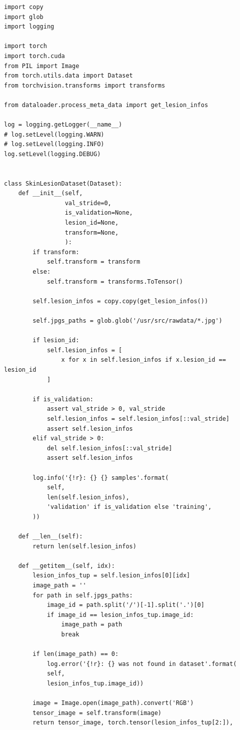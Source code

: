 \begin{lstlisting}
import copy
import glob
import logging

import torch
import torch.cuda
from PIL import Image
from torch.utils.data import Dataset
from torchvision.transforms import transforms

from dataloader.process_meta_data import get_lesion_infos

log = logging.getLogger(__name__)
# log.setLevel(logging.WARN)
# log.setLevel(logging.INFO)
log.setLevel(logging.DEBUG)


class SkinLesionDataset(Dataset):
    def __init__(self,
                 val_stride=0,
                 is_validation=None,
                 lesion_id=None,
                 transform=None,
                 ):
        if transform:
            self.transform = transform
        else:
            self.transform = transforms.ToTensor()

        self.lesion_infos = copy.copy(get_lesion_infos())

        self.jpgs_paths = glob.glob('/usr/src/rawdata/*.jpg')

        if lesion_id:
            self.lesion_infos = [
                x for x in self.lesion_infos if x.lesion_id == lesion_id
            ]

        if is_validation:
            assert val_stride > 0, val_stride
            self.lesion_infos = self.lesion_infos[::val_stride]
            assert self.lesion_infos
        elif val_stride > 0:
            del self.lesion_infos[::val_stride]
            assert self.lesion_infos

        log.info('{!r}: {} {} samples'.format(
            self,
            len(self.lesion_infos),
            'validation' if is_validation else 'training',
        ))

    def __len__(self):
        return len(self.lesion_infos)

    def __getitem__(self, idx):
        lesion_infos_tup = self.lesion_infos[0][idx]
        image_path = ''
        for path in self.jpgs_paths:
            image_id = path.split('/')[-1].split('.')[0]
            if image_id == lesion_infos_tup.image_id:
                image_path = path
                break

        if len(image_path) == 0:
            log.error('{!r}: {} was not found in dataset'.format(
            self,
            lesion_infos_tup.image_id))

        image = Image.open(image_path).convert('RGB')
        tensor_image = self.transform(image)
        return tensor_image, torch.tensor(lesion_infos_tup[2:]),

\end{lstlisting}

